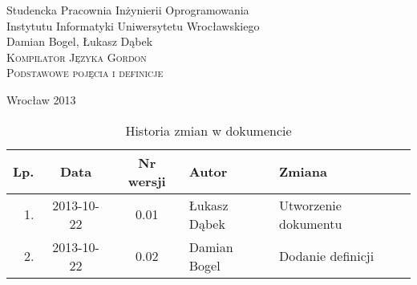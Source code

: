 \documentclass{documentation}
\begin{document}
\begin{titlepage}
\begin{center}
Studencka Pracownia Inżynierii Oprogramowania\\
Instytutu Informatyki Uniwersytetu Wrocławskiego\\[6cm]

Damian Bogel, Łukasz Dąbek\\[1cm]
\textsc{\LARGE Kompilator Języka Gordon}\\[0.5cm]
\textsc{\large Podstawowe pojęcia i definicje}

\vfill
Wrocław 2013 \\[2.5cm]

\end{center}
\end{titlepage}

\newpage
\begin{table}
	\centering
    \captionsetup{name=Tabela,labelsep=period}
	\caption{Historia zmian w dokumencie}
		\begin{tabular}{|r|c|c|l|l|}
		\hline
		Lp.  & Data       & Nr wersji & Autor                 & Zmiana \\ \hline
		1.   & 2013-10-22 & 0.01 & Łukasz Dąbek & Utworzenie dokumentu \\ \hline
        2.   & 2013-10-22 & 0.02 & Damian Bogel & Dodanie definicji \\ \hline
	\end{tabular}
\end{table}
\newpage

\tableofcontents
\setcounter{page}{2}

\newpage
\end{document}
